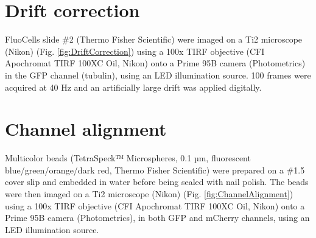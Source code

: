 

\onecolumn %
\fancyhead{} %
\renewcommand{\floatpagefraction}{0.1}
\lfoot[\bSupInf]{\dAuthor}
\rfoot[\dAuthor]{\cSupInf}
\newpage

\captionsetup*{format=largeformat} %
\setcounter{figure}{0} %
\setcounter{equation}{0} %
\setcounter{table}{0} %
\setcounter{page}{1} %
\makeatletter
\renewcommand{\thefigure}{S\@arabic\c@figure} %
\makeatother
\makeatletter
\renewcommand{\thetable}{S\@arabic\c@table} %
\makeatother
\makeatletter
\renewcommand{\theequation}{S\@arabic\c@equation} %
\makeatother





\newpage
\section{Drift correction}
FluoCells slide \#2 (Thermo Fisher Scientific) were imaged on a Ti2 microscope (Nikon) (Fig. \ref{fig:DriftCorrection}) using a 100x TIRF objective (CFI Apochromat TIRF 100XC Oil, Nikon) onto a Prime 95B camera (Photometrics) in the GFP channel (tubulin), using an LED illumination source. 100 frames were acquired at 40 Hz and an artificially large drift was applied digitally.


\section{Channel alignment}

Multicolor beads (TetraSpeck™ Microspheres, 0.1 µm, fluorescent blue/green/orange/dark red, Thermo Fisher Scientific) were prepared on a \#1.5 cover slip and embedded in water before being sealed with nail polish. The beads were then imaged on a Ti2 microscope (Nikon) (Fig. \ref{fig:ChannelAlignment}) using a 100x TIRF objective (CFI Apochromat TIRF 100XC Oil, Nikon) onto a Prime 95B camera (Photometrics), in both GFP and mCherry channels, using an LED illumination source. 

